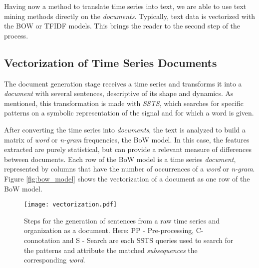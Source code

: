 Having now a method to translate time series into text, we are able to use text mining methods directly on the \textit{documents}. Typically, text data is vectorized with the \gls{BOW} or \gls{TFIDF} models. This brings the reader to the second step of the process.

\subsection{Vectorization of Time Series Documents}

The document generation stage receives a time series and transforms it into a \textit{document} with several sentences, descriptive of its shape and dynamics. As mentioned, this transformation is made with \textit{SSTS}, which searches for specific patterns on a symbolic representation of the signal and for which a word is given.  
\par
After converting the time series into \textit{documents}, the text is analyzed to build a matrix of \textit{word} or \textit{n-gram }frequencies, the \gls{BoW} model. In this case, the features extracted are purely statistical, but can provide a relevant measure of differences between documents. Each row of the \gls{BoW} model is a time series \textit{document}, represented by columns that have the number of occurrences of a \textit{word} or \textit{n-gram}. Figure \ref{fig:bow_model} shows the vectorization of a document as one row of the BoW model.

\begin{figure}[!h]
    \centering
    \texttt{[image: vectorization.pdf]}
    \caption{Steps for the generation of sentences from a raw time series and organization as a document. Here: {PP - Pre-processing, C- connotation and S - Search} are each \gls{SSTS} queries used to search for the patterns and attribute the matched \textit{subsequences} the corresponding \textit{word}.}
    \label{fig:sentence_gen}
\end{figure}

